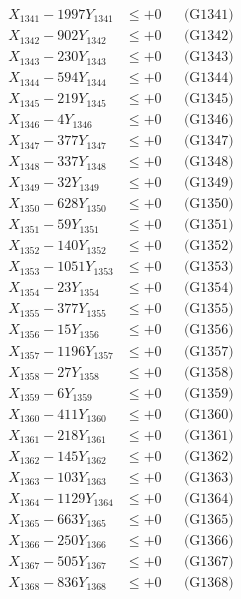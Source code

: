\documentclass[a4paper,10pt]{article}
\begin{document}
{\begin{align}
\allowbreak
X_{1341} - 1997Y_{1341} &\leq +0 && \text{(G1341)} \\
X_{1342} - 902Y_{1342} &\leq +0 && \text{(G1342)} \\
X_{1343} - 230Y_{1343} &\leq +0 && \text{(G1343)} \\
X_{1344} - 594Y_{1344} &\leq +0 && \text{(G1344)} \\
X_{1345} - 219Y_{1345} &\leq +0 && \text{(G1345)} \\
X_{1346} - 4Y_{1346} &\leq +0 && \text{(G1346)} \\
X_{1347} - 377Y_{1347} &\leq +0 && \text{(G1347)} \\
X_{1348} - 337Y_{1348} &\leq +0 && \text{(G1348)} \\
X_{1349} - 32Y_{1349} &\leq +0 && \text{(G1349)} \\
X_{1350} - 628Y_{1350} &\leq +0 && \text{(G1350)} \\
\allowbreak
X_{1351} - 59Y_{1351} &\leq +0 && \text{(G1351)} \\
X_{1352} - 140Y_{1352} &\leq +0 && \text{(G1352)} \\
X_{1353} - 1051Y_{1353} &\leq +0 && \text{(G1353)} \\
X_{1354} - 23Y_{1354} &\leq +0 && \text{(G1354)} \\
X_{1355} - 377Y_{1355} &\leq +0 && \text{(G1355)} \\
X_{1356} - 15Y_{1356} &\leq +0 && \text{(G1356)} \\
X_{1357} - 1196Y_{1357} &\leq +0 && \text{(G1357)} \\
X_{1358} - 27Y_{1358} &\leq +0 && \text{(G1358)} \\
X_{1359} - 6Y_{1359} &\leq +0 && \text{(G1359)} \\
X_{1360} - 411Y_{1360} &\leq +0 && \text{(G1360)} \\
\allowbreak
X_{1361} - 218Y_{1361} &\leq +0 && \text{(G1361)} \\
X_{1362} - 145Y_{1362} &\leq +0 && \text{(G1362)} \\
X_{1363} - 103Y_{1363} &\leq +0 && \text{(G1363)} \\
X_{1364} - 1129Y_{1364} &\leq +0 && \text{(G1364)} \\
X_{1365} - 663Y_{1365} &\leq +0 && \text{(G1365)} \\
X_{1366} - 250Y_{1366} &\leq +0 && \text{(G1366)} \\
X_{1367} - 505Y_{1367} &\leq +0 && \text{(G1367)} \\
X_{1368} - 836Y_{1368} &\leq +0 && \text{(G1368)} \\

\end{align}}
\end{document}
